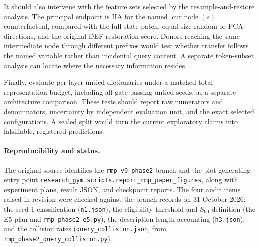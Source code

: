 \documentclass[10pt,letterpaper]{article}
\newcommand{\cur}{\operatorname{cur\_node}}
\begin{document}
It should also intervene with the feature sets selected by the resample-and-restore analysis. The principal endpoint is IIA for the named $\cur(s)$ counterfactual, compared with the full-state patch, equal-size random or PCA directions, and the original DEF restoration score. Donors reaching the same intermediate node through different prefixes would test whether transfer follows the named variable rather than incidental query content. A separate token-subset analysis can locate where the necessary information resides.

Finally, evaluate per-layer untied dictionaries under a matched total representation budget, including all gate-passing untied seeds, as a separate architecture comparison. These tests should report raw numerators and denominators, uncertainty by independent evaluation unit, and the exact selected configurations. A sealed split would turn the current exploratory claims into falsifiable, registered predictions.

\paragraph{Reproducibility and status.} The original source identifies the \texttt{rmp-v0-phase2} branch and the plot-generating entry point \texttt{research\_gym.scripts.report\_rmp\_paper\_figures}, along with experiment plans, result JSON, and checkpoint reports. The four audit items raised in revision were checked against the branch records on 31 October 2026: the seed-1 classification (\texttt{n1.json}), the eligibility threshold and $S_{90}$ definition (the E5 plan and \texttt{rmp\_phase2\_e5.py}), the description-length accounting (\texttt{h3.json}), and the collision rates (\texttt{query\_collision.json}, from \texttt{rmp\_phase2\_query\_collision.py}).
\end{document}
